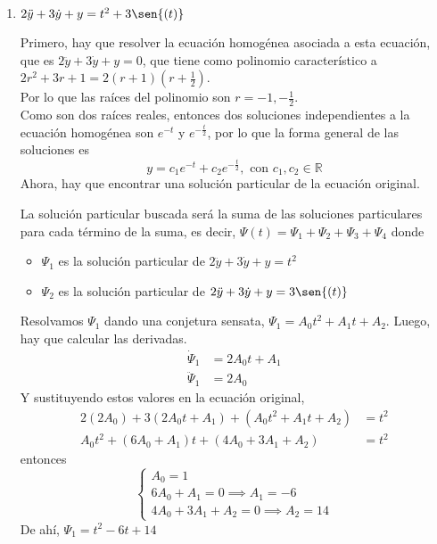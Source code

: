 \documentclass{article}
\begin{document}
\begin{enumerate}
{        }
        \item {
            $2\ddot y+3\dot y+y=t^2+3\sen{(t)}$

            \color{azul}
            Primero, hay que resolver la ecuación homogénea asociada a 
            esta ecuación, que es $2\ddot y+3\dot y+y=0$, que tiene como
            polinomio característico a $2r^2+3r+1 =
            2(r+1)(r+\frac{1}{2})$.\\
            Por lo que las raíces del polinomio son $r = -1, -\frac{1}{2}$.\\
            Como son dos raíces reales, entonces dos soluciones
            independientes a la ecuación homogénea son $e^{-t}$ y 
            $e^{-\frac{t}{2}}$, por lo que la forma general de las
            soluciones es
            \[y = c_1e^{-t} + c_2e^{-\frac{t}{2}}, \text{ con }
            c_1, c_2 \in \mathbb{R}\]
            Ahora, hay que encontrar una solución particular de la
            ecuación original.
            
            La solución particular buscada será la suma de las soluciones particulares para cada
            término de la suma, es decir, $\Psi(t)=\Psi_1+\Psi_2+\Psi_3+\Psi_4$ donde
            \begin{itemize}
            	\item $\Psi_1$ es la solución particular de $2\ddot y+3\dot y+y=t^2$
            	\item $\Psi_2$ es la solución particular de $2\ddot y+3\dot y+y=3\sen{(t)}$
            \end{itemize}
            
            Resolvamos $\Psi_1$ dando una conjetura sensata, $\Psi_1=A_0t^2 + A_1t+A_2$.
            Luego, hay que calcular las derivadas.
            \begin{align*}
            \dot \Psi_1 &= 2A_0t + A_1 \\
            \ddot \Psi_1 &= 2A_0
            \end{align*}
            Y sustituyendo estos valores en la ecuación original, 
            \begin{align*}
				2(2A_0) + 3(2A_0t + A_1)+ (A_0t^2 + A_1t+A_2) &= t^2 \\
				A_0t^2 + (6A_0 + A_1)t+ (4A_0 + 3A_1 + A_2) &= t^2
            \end{align*}    	
            entonces
            \begin{equation*}
            \begin{cases}
            A_0=1 \\
            6A_0 + A_1=0 \implies A_1 = -6\\
            4A_0 + 3A_1 + A_2 = 0 \implies A_2 = 14
            \end{cases}
            \end{equation*}
            De ahí, $\Psi_1 = t^2 -6t + 14$\\
            
}
\end{enumerate}
\end{document}
